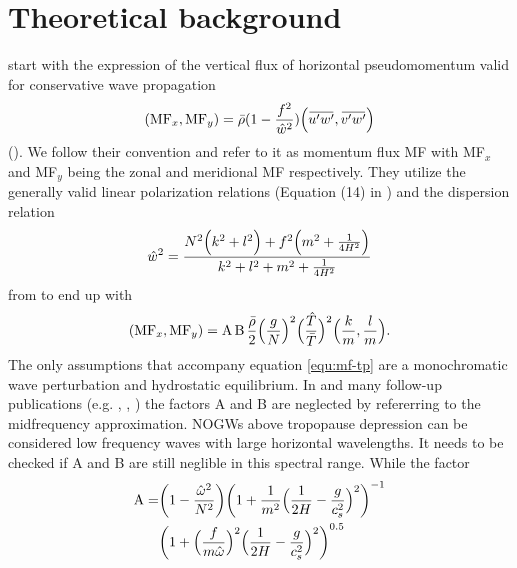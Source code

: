 \section{Theoretical background}
\textcite{ern_absolute_2004} start with the expression of the vertical flux of horizontal pseudomomentum valid for conservative wave propagation
\begin{equation}
    (\mathrm{MF}_x, \mathrm{MF}_y) = \bar{\rho} (1-\frac{f^2}{\hat{w}^2}) \Bigl(\overbar{u'w'},\overbar{v'w'}\Bigr) 
    \label{equ:ps-mf}
\end{equation}
(\cite[]{fritts_gravity_2003}). We follow their convention and refer to it as momentum flux MF with MF$_x$ and MF$_y$ being the zonal and meridional MF respectively. They utilize the generally valid linear polarization relations (Equation (14) in \textcite[]{fritts_gravity_2003}) and the dispersion relation
\begin{equation}
    \hat{w}^2 = \frac{N^2 \Bigl(k^2+l^2\Bigr) + f^2 \Bigl(m^2 + \frac{1}{4H^2}\Bigr)}{k^2+l^2+m^2+\frac{1}{4H^2}}
    \label{equ_lid:dispersion_noAss}
\end{equation}
from \textcite[]{fritts_gravity_2003} to end up with
\begin{equation}
    (\mathrm{MF}_x, \mathrm{MF}_y) = \textrm{A} \, \textrm{B} \, \frac{\bar{\rho}}{2} \Bigl(\frac{g}{N}\Bigr)^2 {\Bigl(\frac{\hat{T}}{\bar{T}}\Bigr)^2} \Bigl(\frac{k}{m},\frac{l}{m}\Bigr).
    \label{equ:mf-tp}
\end{equation}
The only assumptions that accompany equation \ref{equ:mf-tp} are a monochromatic wave perturbation and hydrostatic equilibrium. In \textcite[]{ern_absolute_2004} and many follow-up publications (e.g. \cite[]{preusse_characteristics_2014}, \cite[]{ern_gracile_2018}, \cite[]{hindley_gravity_2019}) the factors A and B are neglected by refererring to the midfrequency approximation. NOGWs above tropopause depression can be considered low frequency waves with large horizontal wavelengths. It needs to be checked if A and B are still neglible in this spectral range. While the factor
\begin{equation}
    \begin{split}
        \textrm{A} = &\biggl(1-\frac{\hat{\omega}^2}{N^2}\biggr) \biggl(1 + \frac{1}{m^2} \Bigl(\frac{1}{2H}-\frac{g}{c_s^2}\Bigr)^2\biggr)^{-1} \\
            &\biggl(1+\Bigl(\frac{f}{m \hat{\omega}}\Bigr)^2 \Bigl(\frac{1}{2H} - \frac{g}{c_s^2}\Bigr)^2\biggr)^{0.5}
    \end{split}
    \label{equ:A}
\end{equation}
